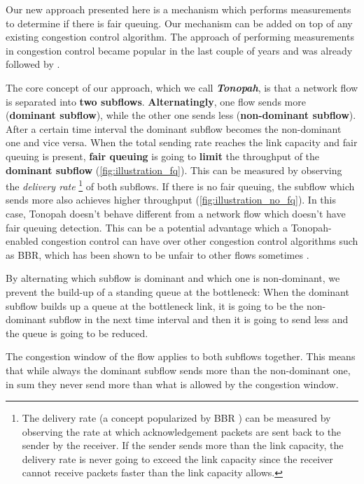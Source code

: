 \documentclass[conference]{IEEEtran}
\begin{document}
Our new approach presented here is a mechanism which performs measurements to determine if there is fair queuing. Our mechanism can be added on top of any existing congestion control algorithm. 
The approach of performing measurements in congestion control became popular in the last couple of years and was already followed by \cite{cardwell_bbr_2016,dong_pcc_2015,goyal_elasticity_2020,hayes_online_2020}.

The core concept of our approach, which we call \textbf{\textit{Tonopah}}, is that a network flow is separated into \textbf{two subflows}. 
\textbf{Alternatingly}, one flow sends more (\textbf{dominant subflow}), while the other one sends less (\textbf{non-dominant subflow}). 
After a certain time interval the dominant subflow becomes the non-dominant one and vice versa. 
When the total sending rate reaches the link capacity and fair queuing is present, 
\textbf{fair queuing} is going to \textbf{limit} the throughput of the \textbf{dominant subflow} (\autoref{fig:illustration_fq}). 
This can be measured by observing the \textit{delivery rate}
\footnote{The delivery rate (a concept popularized by BBR \cite{cardwell_bbr_2016}) can be measured by observing the rate at which acknowledgement packets are sent back to the sender by the receiver.
If the sender sends more than the link capacity, the delivery rate is never going to exceed the link capacity since the receiver cannot receive packets faster than the link capacity allows. 
}
of both subflows. If there is no fair queuing, the subflow which sends more also achieves higher throughput (\autoref{fig:illustration_no_fq}). 
In this case, Tonopah doesn't behave different from a network flow which doesn't have fair queuing detection. 
This can be a potential advantage which a Tonopah-enabled congestion control can have over other congestion control algorithms such as BBR, which has been shown to be unfair to other flows sometimes \cite{ware_modeling_2019,hock_experimental_2017}.

By alternating which subflow is dominant and which one is non-dominant, we prevent the build-up of a standing queue at the bottleneck: 
When the dominant subflow builds up a queue at the bottleneck link, it is going to be the non-dominant subflow in the next time interval and then it is going to send less and the queue is going to be reduced. 

The congestion window of the flow applies to both subflows together. This means that while always the dominant subflow sends more than the non-dominant one, in sum they never send more than what is allowed by the congestion window.
\end{document}
